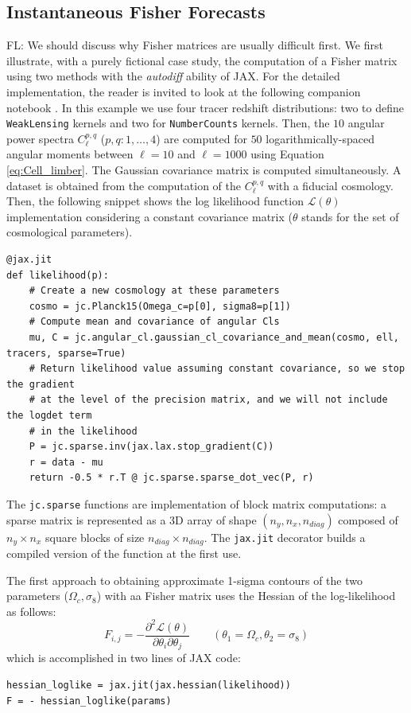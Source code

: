 \documentclass[twocolumn,twocolappendix,nofootinbib,iop]{openjournal}
\newcommand{\nblink}[1]{\href{https://github.com/DifferentiableUniverseInitiative/jax-cosmo-paper/blob/master/notebooks/#1.ipynb}{\faFileCodeO}}
\newcommand{\FrL}[1]{{\color{cyan}FL: #1}}
\begin{document}
\subsection{Instantaneous Fisher Forecasts}
\FrL{We should discuss why Fisher matrices are usually difficult first.}
We first illustrate, with a purely fictional case study, the computation of a Fisher matrix \citep{1997ApJ...480...22T,Stuart1991} using two methods with the \textit{autodiff} ability of JAX. For the detailed implementation, the reader is invited to look at the following companion notebook \nblink{Simple-Fisher}. In this example we use four tracer redshift distributions: two to define \texttt{WeakLensing} kernels and two for \texttt{NumberCounts} kernels. Then, the $10$ angular power spectra $C_\ell^{p,q}$ ($p,q:1,\dots,4$) are computed for $50$  logarithmically-spaced angular moments between $\ell=10$ and $\ell=1000$ using Equation \ref{eq:Cell_limber}. The Gaussian covariance matrix is computed simultaneously. A dataset is obtained from the computation of the $C_\ell^{p,q}$ with a fiducial cosmology. Then, the following snippet shows the log likelihood function $\mathcal{L}(\theta)$ implementation considering a constant covariance matrix ($\theta$ stands for the set of cosmological parameters). 
\begin{lstlisting}[language=iPython]
@jax.jit
def likelihood(p):
    # Create a new cosmology at these parameters
    cosmo = jc.Planck15(Omega_c=p[0], sigma8=p[1])
    # Compute mean and covariance of angular Cls
    mu, C = jc.angular_cl.gaussian_cl_covariance_and_mean(cosmo, ell, tracers, sparse=True)
    # Return likelihood value assuming constant covariance, so we stop the gradient
    # at the level of the precision matrix, and we will not include the logdet term
    # in the likelihood
    P = jc.sparse.inv(jax.lax.stop_gradient(C))
    r = data - mu
    return -0.5 * r.T @ jc.sparse.sparse_dot_vec(P, r)
\end{lstlisting}
The \texttt{jc.sparse} functions are implementation of block matrix computations: a sparse matrix is represented as a 3D array of shape $(n_y, n_x, n_{diag})$ composed of $n_y \times n_x$ square blocks of size $n_{diag} \times n_{diag}$.  The \texttt{jax.jit} decorator builds a compiled version of the function at the first use. 

The first approach to obtaining approximate 1-sigma contours of the two parameters ($\Omega_c, \sigma_8$) with aa Fisher matrix uses the Hessian of the log-likelihood as follows:
\begin{equation}
F_{i,j} = - \frac{\partial^2\mathcal{L}(\theta)}{\partial \theta_i \partial \theta_j}
\qquad (\theta_1=\Omega_c, \theta_2=\sigma_8)
\label{eq:fisher_way1}
\end{equation}
which is accomplished in two lines of JAX code:
\begin{lstlisting}[language=iPython]
hessian_loglike = jax.jit(jax.hessian(likelihood))
F = - hessian_loglike(params)
\end{lstlisting}
\end{document}
